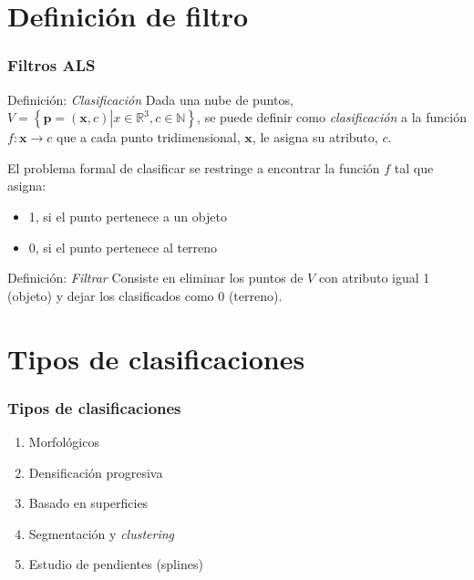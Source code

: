 \section{Definición de filtro}
\begin{frame}[label=filter_def]
    \frametitle{Filtros ALS}
    \begin{beamerboxesrounded}[shadow=true]{Definición: \emph{Clasificación}}
      Dada una nube de puntos,$V = \left\lbrace \mathbf{p}=\left(\mathbf{x},c\right) 
      \left| x \in \mathbb{R}^3, c \in \mathbb{N} \right. \right\rbrace $, se 
      puede definir como \alert{\emph{clasificación}} a la función $f: \mathbf{x} \to c$ 
      que a cada punto tridimensional, $\mathbf{x}$, le asigna su atributo, $c$.
    \end{beamerboxesrounded}

    {El problema formal de clasificar se restringe a encontrar la función $f$ tal que asigna:
    \begin{itemize}
      \item \alert{1}, si el punto pertenece a un \alert{objeto}
      \item \alert{0}, si el punto pertenece al \alert{terreno}
    \end{itemize}}

    \begin{beamerboxesrounded}[shadow=true]{Definición: \emph{Filtrar}}
     Consiste en \alert{eliminar} los puntos de $V$ con atributo igual 1 (objeto) y dejar los clasificados como 0 (terreno).
    \end{beamerboxesrounded}
\end{frame}
\section{Tipos de clasificaciones}
\begin{frame}
    \frametitle{Tipos de clasificaciones}
    \begin{enumerate}
        \item Morfológicos
        \item Densificación progresiva
        \item Basado en superficies
        \item Segmentación y \emph{clustering}
        \item Estudio de pendientes (splines)
    \end{enumerate}
\end{frame}
